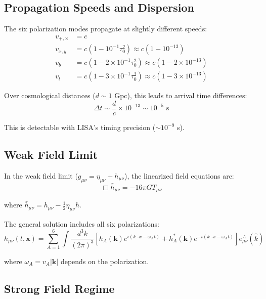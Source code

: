 \subsection{Propagation Speeds and Dispersion}

The six polarization modes propagate at slightly different speeds:
\begin{align}
    v_{+,\times} &= c \\
    v_{x,y} &= c(1 - 10^{-1}\tau_0^2) \approx c(1 - 10^{-13}) \\
    v_b &= c(1 - 2 \times 10^{-1}\tau_0^2) \approx c(1 - 2 \times 10^{-13}) \\
    v_l &= c(1 - 3 \times 10^{-1}\tau_0^2) \approx c(1 - 3 \times 10^{-13})
\end{align}

Over cosmological distances ($d \sim 1$ Gpc), this leads to arrival time differences:
\begin{equation}
    \Delta t \sim \frac{d}{c} \times 10^{-13} \sim 10^{-5} \text{ s}
\end{equation}

This is detectable with LISA's timing precision ($\sim 10^{-9}$ s).

\subsection{Weak Field Limit}

In the weak field limit ($g_{\mu\nu} = \eta_{\mu\nu} + h_{\mu\nu}$), the linearized field equations are:
\begin{equation}
    \Box \bar{h}_{\mu\nu} = -16\pi G T_{\mu\nu}
\end{equation}

where $\bar{h}_{\mu\nu} = h_{\mu\nu} - \frac{1}{2}\eta_{\mu\nu}h$.

The general solution includes all six polarizations:
\begin{equation}
    h_{\mu\nu}(t,\mathbf{x}) = \sum_{A=1}^6 \int \frac{d^3k}{(2\pi)^3} \left[ h_A(\mathbf{k}) e^{i(k \cdot x - \omega_A t)} + h_A^*(\mathbf{k}) e^{-i(k \cdot x - \omega_A t)} \right] e^A_{\mu\nu}(\hat{k})
\end{equation}

where $\omega_A = v_A |\mathbf{k}|$ depends on the polarization.

\subsection{Strong Field Regime}

